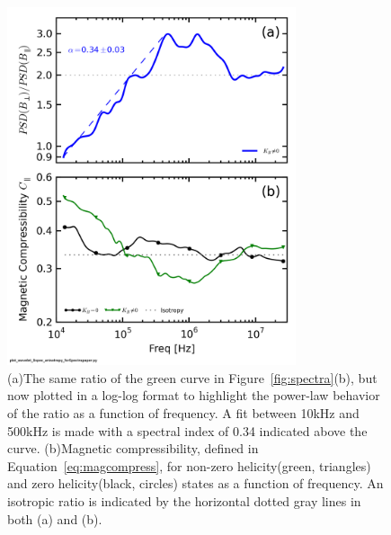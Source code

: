 \documentclass[aip,prl,amsmath,amssymb,reprint,superscriptaddress]{revtex4-1} %
\begin{document}
\begin{figure}[!htbp]
\centerline{
\includegraphics[width=8.5cm]{mag_compressibility_0helchan1t4prelim_1helchan1t6Kiydef_wratio_wfit}}
\caption{\label{fig:fitratio} (a)The same ratio of the green curve in Figure~\ref{fig:spectra}(b), but now plotted in a log-log format to highlight the power-law behavior of the ratio as a function of frequency. A fit between 10kHz and 500kHz is made with a spectral index of 0.34 indicated above the curve. (b)Magnetic compressibility, defined in Equation~\ref{eq:magcompress}, for non-zero helicity(green, triangles) and zero helicity(black, circles) states as a function of frequency. An isotropic ratio is indicated by the horizontal dotted gray lines in both (a) and (b).}
\end{figure}
\end{document}

